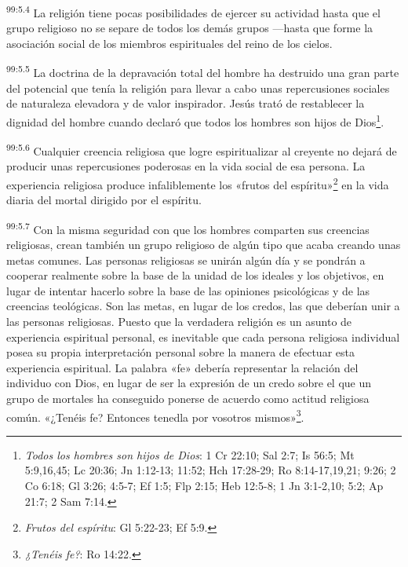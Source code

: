\par
\textsuperscript{99:5.4} La religión tiene pocas posibilidades de ejercer su actividad hasta que el grupo religioso no se separe de todos los demás grupos ---hasta que forme la asociación social de los miembros espirituales del reino de los cielos.

\par
\textsuperscript{99:5.5} La doctrina de la depravación total del hombre ha destruido una gran parte del potencial que tenía la religión para llevar a cabo unas repercusiones sociales de naturaleza elevadora y de valor inspirador. Jesús trató de restablecer la dignidad del hombre cuando declaró que todos los hombres son hijos de Dios\footnote{\textit{Todos los hombres son hijos de Dios}: 1 Cr 22:10; Sal 2:7; Is 56:5; Mt 5:9,16,45; Lc 20:36; Jn 1:12-13; 11:52; Hch 17:28-29; Ro 8:14-17,19,21; 9:26; 2 Co 6:18; Gl 3:26; 4:5-7; Ef 1:5; Flp 2:15; Heb 12:5-8; 1 Jn 3:1-2,10; 5:2; Ap 21:7; 2 Sam 7:14.}.

\par
\textsuperscript{99:5.6} Cualquier creencia religiosa que logre espiritualizar al creyente no dejará de producir unas repercusiones poderosas en la vida social de esa persona. La experiencia religiosa produce infaliblemente los «frutos del espíritu»\footnote{\textit{Frutos del espíritu}: Gl 5:22-23; Ef 5:9.} en la vida diaria del mortal dirigido por el espíritu.

\par
\textsuperscript{99:5.7} Con la misma seguridad con que los hombres comparten sus creencias religiosas, crean también un grupo religioso de algún tipo que acaba creando unas metas comunes. Las personas religiosas se unirán algún día y se pondrán a cooperar realmente sobre la base de la unidad de los ideales y los objetivos, en lugar de intentar hacerlo sobre la base de las opiniones psicológicas y de las creencias teológicas. Son las metas, en lugar de los credos, las que deberían unir a las personas religiosas. Puesto que la verdadera religión es un asunto de experiencia espiritual personal, es inevitable que cada persona religiosa individual posea su propia interpretación personal sobre la manera de efectuar esta experiencia espiritual. La palabra «fe» debería representar la relación del individuo con Dios, en lugar de ser la expresión de un credo sobre el que un grupo de mortales ha conseguido ponerse de acuerdo como actitud religiosa común. «¿Tenéis fe? Entonces tenedla por vosotros mismos»\footnote{\textit{¿Tenéis fe?}: Ro 14:22.}.

